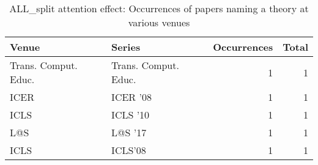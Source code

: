 \begin{table*}[t]
\begin{tabular}{llrr}
Venue & Series & Occurrences & Total\\\hline
\multirow{1}{*}{Trans. Comput. Educ.} & Trans. Comput. Educ. & 1 & \multirow{1}{*}{1}\\
\multirow{1}{*}{ICER } & ICER '08 & 1 & \multirow{1}{*}{1}\\
\multirow{1}{*}{ICLS } & ICLS '10 & 1 & \multirow{1}{*}{1}\\
\multirow{1}{*}{L@S } & L@S '17 & 1 & \multirow{1}{*}{1}\\
\multirow{1}{*}{ICLS} & ICLS'08 & 1 & \multirow{1}{*}{1}\\
\end{tabular}
\caption{ALL\_split attention effect: Occurrences of papers naming a theory at various venues}
\end{table*}
